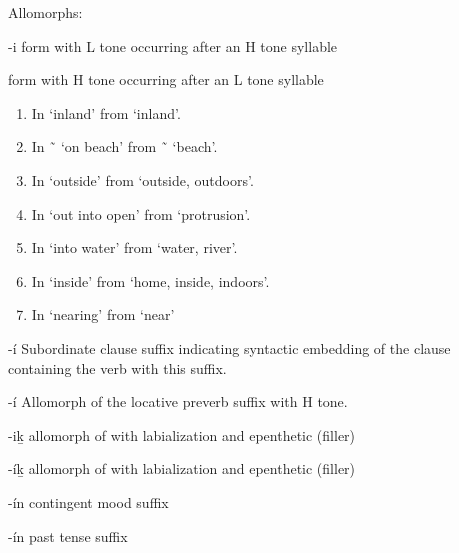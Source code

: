 \begin{morphdesc}[resume*=alphalist]
	Allomorphs:
	\begin{allolist}
	\item[-i]	form with L tone occurring after an H tone syllable
	\item[{\X[-í-loc]{-í}}]
			form with H tone occurring after an L tone syllable
	\end{allolist}
	\begin{enumerate}
	\item\label{item:-i-loc-dáag̱i}
		In  ‘inland’ from  ‘inland’.
	\item\label{item:-i-loc-éeg̱i}
		In  \~\  ‘on beach’ from  \~\  ‘beach’.
	\item\label{item:-i-loc-gáani}
		In  ‘outside’ from  ‘outside, outdoors’.
	\item\label{item:-i-loc-gági}
		In  ‘out into open’ from  ‘protrusion’.
	\item\label{item:-i-loc-héeni}
		In  ‘into water’ from  ‘water, river’.
	\item\label{item:-i-loc-neilí}
		In  ‘inside’ from  ‘home, inside, indoors’.
	\item\label{item:-i-loc-x̱áni}
		In  ‘nearing’ from  ‘near’
	\end{enumerate}

\item[-í]\label{m:-í-sub}
	Subordinate clause suffix indicating syntactic embedding of the clause containing the
		verb with this suffix.

\item[-í]\label{m:-í-loc}
	Allomorph of the locative preverb suffix  with H tone.

\item[-iḵ]\label{m:-iḵ}
	allomorph of  with labialization and epenthetic (filler) 

\item[-íḵ]\label{m:-íḵ}
	allomorph of  with labialization and epenthetic (filler) 

\item[-ín]\label{m:-ín-ctng}
	contingent mood suffix

\item[-ín]\label{m:-ín-past}
	past tense suffix
\end{morphdesc}
